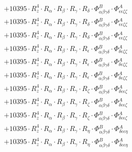 \documentclass{article}
\begin{document}
\begin{subequations}
\begin{gather}
\begin{array}{c}
 \\[0.2em] 		 + 10395 \cdot R_{z}^{4} \cdot R_{\alpha{}} \cdot R_{\beta{}} \cdot R_{\gamma{}} \cdot R_{\delta{}} \cdot \Phi{}^{B}_{\alpha{}\beta{}\gamma{}\delta{}} \cdot \Phi{}^{A}_{\epsilon{}\epsilon{}\zeta{}\zeta{}} 
 \\[0.2em] 		 + 10395 \cdot R_{z}^{4} \cdot R_{\alpha{}} \cdot R_{\beta{}} \cdot R_{\gamma{}} \cdot R_{\delta{}} \cdot \Phi{}^{B}_{\alpha{}\beta{}\gamma{}\delta{}} \cdot \Phi{}^{A}_{\epsilon{}\epsilon{}\zeta{}\zeta{}} 
 \\[0.2em] 		 + 10395 \cdot R_{z}^{4} \cdot R_{\alpha{}} \cdot R_{\beta{}} \cdot R_{\gamma{}} \cdot R_{\delta{}} \cdot \Phi{}^{B}_{\alpha{}\beta{}\gamma{}\delta{}} \cdot \Phi{}^{A}_{\epsilon{}\epsilon{}\zeta{}\zeta{}} 
 \\[0.2em] 		 + 10395 \cdot R_{z}^{4} \cdot R_{\alpha{}} \cdot R_{\beta{}} \cdot R_{\gamma{}} \cdot R_{\epsilon{}} \cdot \Phi{}^{B}_{\alpha{}\beta{}\gamma{}\delta{}} \cdot \Phi{}^{A}_{\delta{}\epsilon{}\zeta{}\zeta{}} 
 \\[0.2em] 		 + 10395 \cdot R_{z}^{4} \cdot R_{\alpha{}} \cdot R_{\beta{}} \cdot R_{\gamma{}} \cdot R_{\epsilon{}} \cdot \Phi{}^{B}_{\alpha{}\beta{}\gamma{}\delta{}} \cdot \Phi{}^{A}_{\delta{}\epsilon{}\zeta{}\zeta{}} 
 \\[0.2em] 		 + 10395 \cdot R_{z}^{4} \cdot R_{\alpha{}} \cdot R_{\beta{}} \cdot R_{\gamma{}} \cdot R_{\epsilon{}} \cdot \Phi{}^{B}_{\alpha{}\beta{}\gamma{}\delta{}} \cdot \Phi{}^{A}_{\delta{}\epsilon{}\zeta{}\zeta{}} 
 \\[0.2em] 		 + 10395 \cdot R_{z}^{4} \cdot R_{\alpha{}} \cdot R_{\beta{}} \cdot R_{\gamma{}} \cdot R_{\zeta{}} \cdot \Phi{}^{B}_{\alpha{}\beta{}\gamma{}\delta{}} \cdot \Phi{}^{A}_{\delta{}\epsilon{}\epsilon{}\zeta{}} 
 \\[0.2em] 		 + 10395 \cdot R_{z}^{4} \cdot R_{\alpha{}} \cdot R_{\beta{}} \cdot R_{\gamma{}} \cdot R_{\zeta{}} \cdot \Phi{}^{B}_{\alpha{}\beta{}\gamma{}\delta{}} \cdot \Phi{}^{A}_{\delta{}\epsilon{}\epsilon{}\zeta{}} 
 \\[0.2em] 		 + 10395 \cdot R_{z}^{4} \cdot R_{\alpha{}} \cdot R_{\beta{}} \cdot R_{\gamma{}} \cdot R_{\zeta{}} \cdot \Phi{}^{B}_{\alpha{}\beta{}\gamma{}\delta{}} \cdot \Phi{}^{A}_{\delta{}\epsilon{}\epsilon{}\zeta{}} 
 \\[0.2em] 		 + 10395 \cdot R_{z}^{4} \cdot R_{\alpha{}} \cdot R_{\beta{}} \cdot R_{\gamma{}} \cdot R_{\eta{}} \cdot \Phi{}^{B}_{\alpha{}\beta{}\gamma{}\delta{}} \cdot \Phi{}^{A}_{\delta{}\epsilon{}\epsilon{}\eta{}} 
 \\[0.2em] 		 + 10395 \cdot R_{z}^{4} \cdot R_{\alpha{}} \cdot R_{\beta{}} \cdot R_{\gamma{}} \cdot R_{\eta{}} \cdot \Phi{}^{B}_{\alpha{}\beta{}\gamma{}\delta{}} \cdot \Phi{}^{A}_{\delta{}\epsilon{}\epsilon{}\eta{}} 

\end{array}
\end{gather}
\end{subequations}
\end{document}
